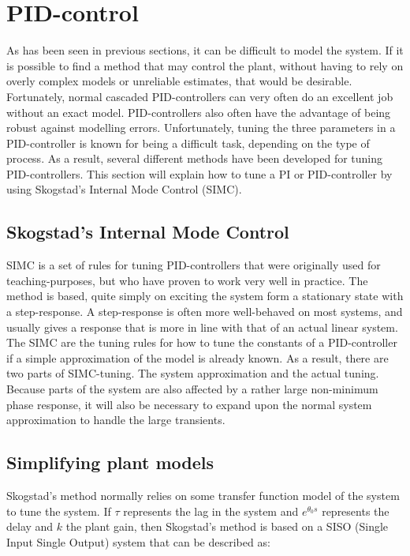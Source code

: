 \section{PID-control}


As has been seen in previous sections, it can be difficult to model the system. If it is possible to find a method that may control the plant, without having to rely on overly complex models or unreliable estimates, that would be desirable. Fortunately, normal cascaded PID-controllers can very often do an excellent job without an exact model. PID-controllers also often have the advantage of being robust against modelling errors. Unfortunately, tuning the three parameters in a PID-controller is known for being a difficult task, depending on the type of process. As a result, several different methods have been developed for tuning PID-controllers. This section will explain how to tune a PI or PID-controller by using Skogstad's Internal Mode Control (SIMC). 


\subsection{Skogstad's Internal Mode Control}

SIMC is a set of rules for tuning PID-controllers that were originally used for teaching-purposes, but who have proven to work very well in practice. The method is based, quite simply on exciting the system form a stationary state with a step-response. A step-response is often more well-behaved on most systems, and usually gives a response that is more in line with that of an actual linear system. The SIMC are the tuning rules for how to tune the constants of a PID-controller if a simple approximation of the model is already known. As a result, there are two parts of SIMC-tuning. The system approximation and the actual tuning. Because parts of the system are also affected by a rather large non-minimum phase response, it will also be necessary to expand upon the normal system approximation to handle the large transients. 





\subsection{Simplifying plant models}

Skogstad's method normally relies on some transfer function model of the system to tune the system. If $\tau$ represents the lag in the system and $e^{\theta_0 s}$ represents the delay and $k$ the plant gain, then Skogstad's method is based on a SISO (Single Input Single Output)  system that can be described as: 

